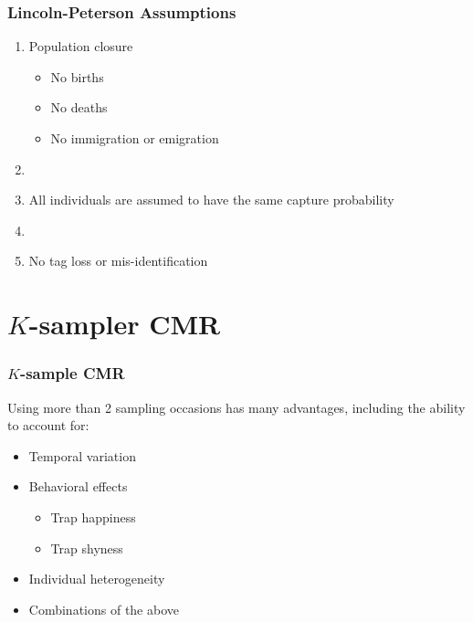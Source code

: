 \documentclass[color=usenames,dvipsnames]{beamer}\usepackage[]{graphicx}\usepackage[]{xcolor}
\begin{document}





\begin{frame}
  \frametitle{Lincoln-Peterson Assumptions}
  \large
  \begin{enumerate}[\bf (1)]
    \item<1-> Population closure
      \begin{itemize}
        \large
        \item No births
        \item No deaths
        \item No immigration or emigration
      \end{itemize}
    \item[]
    \item<2-> All individuals are assumed to have the same capture probability
    \item[]
    \item<3-> No tag loss or mis-identification
  \end{enumerate}
\end{frame}





\section{$K$-sampler CMR}






\begin{frame}
  \frametitle{$K$-sample CMR}
  \large
  Using more than 2 sampling occasions has many advantages, including
  the ability to account for:
  \begin{itemize}[<+->]
    \large
    \item Temporal variation
    \item Behavioral effects
      \begin{itemize}
        \large
        \item Trap happiness
        \item Trap shyness
      \end{itemize}
    \item Individual heterogeneity
    \item Combinations of the above
  \end{itemize}
\end{frame}
\end{document}

